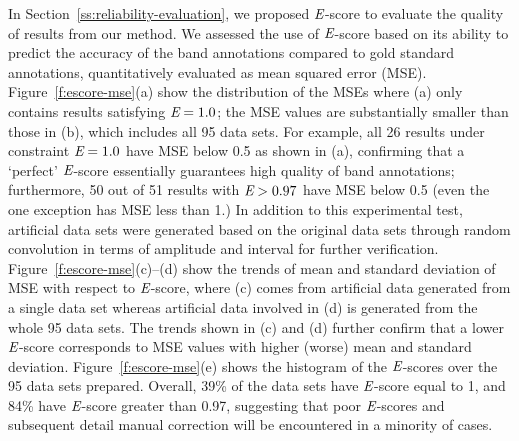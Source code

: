 In Section~\ref{ss:reliability-evaluation}, we proposed ${\emph{E}}$-score to evaluate the quality of results from our method. We assessed the use of ${\emph{E}}$-score based on its ability to predict the accuracy of the band annotations compared to gold standard annotations, quantitatively evaluated as mean squared error (MSE). Figure~\ref{f:escore-mse}(a) show the distribution of the MSEs where (a) only contains results satisfying ${\emph{E}} = 1.0$; the MSE values are substantially smaller than those in (b), which includes all 95 data sets.  For example, all 26 results under constraint ${\emph{E}}=1.0$ have MSE below 0.5 as shown in (a), confirming that a `perfect' ${\emph{E}}$-score essentially guarantees high quality of band annotations; furthermore, 50 out of 51 results with ${\emph{E}}>0.97$ have MSE below 0.5 (even the one exception has MSE less than 1.) In addition to this experimental test, artificial data sets were generated based on the original data sets through random convolution in terms of amplitude and interval for further verification. Figure~\ref{f:escore-mse}(c)--(d) show the trends of mean and standard deviation of MSE with respect to ${\emph{E}}$-score, where (c) comes from artificial data generated from a single data set whereas artificial data involved in (d) is generated from the whole 95 data sets. The trends shown in (c) and (d) further confirm that a lower ${\emph{E}}$-score corresponds to MSE values with higher (worse) mean and standard deviation. Figure~\ref{f:escore-mse}(e) shows the histogram of the ${\emph{E}}$-scores over the 95 data sets prepared. Overall, 39\%  of the data sets have ${\emph{E}}$-score equal to 1, and 84\%  have ${\emph{E}}$-score greater than 0.97, suggesting that poor ${\emph{E}}$-scores and subsequent detail manual correction will be encountered in a minority of cases.

